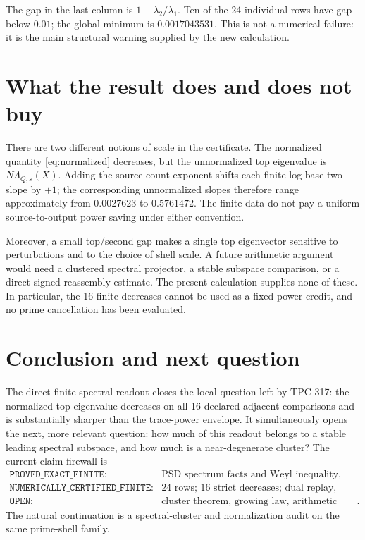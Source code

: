 \documentclass[10pt]{article}
\begin{document}
The gap in the last column is
$1-\lambda_2/\lambda_1$.  Ten of the 24 individual rows have gap below
$0.01$; the global minimum is $0.0017043531$.  This is not a numerical failure:
it is the main structural warning supplied by the new calculation.

\section{What the result does and does not buy}

There are two different notions of scale in the certificate.  The normalized
quantity \eqref{eq:normalized} decreases, but the unnormalized top eigenvalue is
$N\Lambda_{Q,s}(X)$.  Adding the source-count exponent shifts each finite
log-base-two slope by $+1$; the corresponding unnormalized slopes therefore
range approximately from $0.0027623$ to $0.5761472$.  The finite data do not
pay a uniform source-to-output power saving under either convention.

Moreover, a small top/second gap makes a single top eigenvector sensitive to
perturbations and to the choice of shell scale.  A future arithmetic argument
would need a clustered spectral projector, a stable subspace comparison, or a
direct signed reassembly estimate.  The present calculation supplies none of
these.  In particular, the 16 finite decreases cannot be used as a fixed-power
credit, and no prime cancellation has been evaluated.

\section{Conclusion and next question}

The direct finite spectral readout closes the local question left by TPC-317:
the normalized top eigenvalue decreases on all 16 declared adjacent comparisons
and is substantially sharper than the trace-power envelope.  It simultaneously
opens the next, more relevant question: how much of this readout belongs to a
stable leading spectral subspace, and how much is a near-degenerate cluster?
The current claim firewall is
\[
\begin{array}{ll}
\texttt{PROVED\_EXACT\_FINITE}:&\text{PSD spectrum facts and Weyl inequality},\\
\texttt{NUMERICALLY\_CERTIFIED\_FINITE}:&24\text{ rows; }16\text{ strict decreases; dual replay},\\
\texttt{OPEN}:&\text{cluster theorem, growing law, arithmetic cancellation, Gate B, TPC}.
\end{array}
\]
The natural continuation is a spectral-cluster and normalization audit on the
same prime-shell family.
\end{document}
